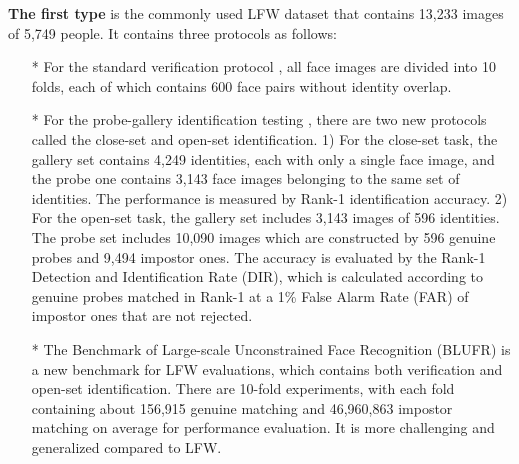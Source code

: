 \documentclass[journal,transmag]{IEEEtran}
\begin{document}
\textbf{The first type} is the commonly used LFW dataset \cite{huang2007labeled} that contains 13,233 images of 5,749 people. It contains three protocols as follows:
\begin{itemize}\setlength{\itemsep}{1pt}
\item[*] For the standard verification protocol \cite{huang2007labeled}, all face images are divided into 10 folds, each of which contains 600 face pairs without identity overlap.
\item[*] For the probe-gallery identification testing \cite{best2014unconstrained}, there are two new protocols called the close-set and open-set identification. 1) For the close-set task, the gallery set contains 4,249 identities, each with only a single face image, and the probe one contains 3,143 face images belonging to the same set of identities. The performance is measured by Rank-1 identification accuracy. 2) For the open-set task, the gallery set includes 3,143 images of 596 identities. The probe set includes 10,090 images which are constructed by 596 genuine probes and 9,494 impostor ones. The accuracy is evaluated by the Rank-1 Detection and Identification Rate (DIR), which is calculated according to genuine probes matched in Rank-1 at a 1\% False Alarm Rate (FAR) of impostor ones that are not rejected.
\item[*] The Benchmark of Large-scale Unconstrained Face Recognition (BLUFR) \cite{DBLP:conf/icb/LiaoLYL14} is a new benchmark for LFW evaluations, which contains both verification and open-set identification. There are 10-fold experiments, with each fold containing about 156,915 genuine matching and 46,960,863 impostor matching on average for performance evaluation. It is more challenging and generalized compared to LFW.
\end{itemize}
\end{document}
